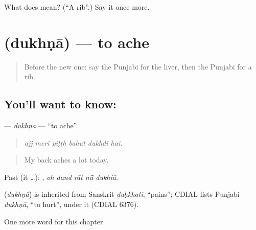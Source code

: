 \begin{tcolorbox}[breakable,colback=teal!4,colframe=teal!35!black,title={Before you move on}]
What does  mean? (\textquotedblleft{}A rib\textquotedblright{}.) Say it once more.
\end{tcolorbox}
\section[\texorpdfstring{\pa{ਦੁਖਣਾ} (dukhṇā)}{ਦੁਖਣਾ (dukhṇā)}]{ (dukhṇā) — to ache}

\label{lesson:PA-C323-dukhna}



\begin{quote}
Before the new one: say the Punjabi for the liver, then the Punjabi for a rib.
\end{quote}

\subsection*{You'll want to know: }
\textbf{} — \emph{dukhṇā} — \textquotedblleft{}to ache\textquotedblright{}.

\begin{quote}
     
\end{quote}

\begin{quote}
\emph{ajj merī piṭṭh bahut dukhdī hai.}
\end{quote}

\begin{quote}
My back aches a lot today.
\end{quote}

Past (it …):     , \emph{oh dand rāt nū̃ dukhiā}.

\begin{cousinweb}
\textbf{} (\emph{dukhṇā}) is inherited from Sanskrit \emph{duḥkhati}, \textquotedblleft{}pains\textquotedblright{}; CDIAL lists Punjabi \emph{dukhṇā}, \textquotedblleft{}to hurt\textquotedblright{}, under it (CDIAL 6376).
\end{cousinweb}

\begin{grammarlens}[title={What you've built}]
One more word for this chapter.
\end{grammarlens}

